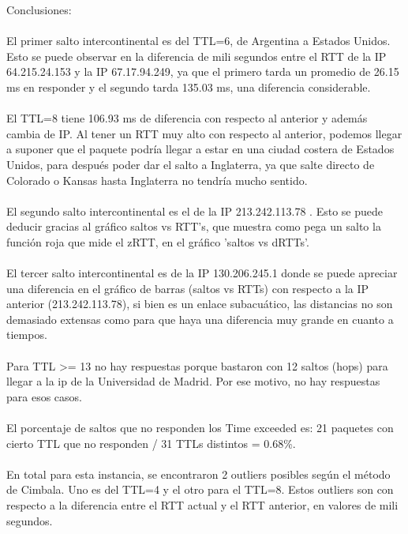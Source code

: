 Conclusiones: \\ \\

El primer salto intercontinental es del TTL=6, de Argentina a Estados Unidos. Esto se puede observar en la diferencia de mili segundos entre 
el RTT de la IP 64.215.24.153 y la IP 67.17.94.249, ya que el primero tarda un promedio de 26.15 ms en responder y el segundo tarda 135.03 ms,
una diferencia considerable. \\ \\

El TTL=8 tiene 106.93 ms de diferencia con respecto al anterior y además cambia de IP. Al tener un RTT muy alto con respecto al anterior,
podemos llegar a suponer que el paquete podría llegar a estar en una ciudad costera de Estados Unidos, para después poder dar el salto a Inglaterra,
ya que salte directo de Colorado o Kansas hasta Inglaterra no tendría mucho sentido. \\ \\

El segundo salto intercontinental es el de la IP 213.242.113.78 . Esto se puede deducir gracias al gráfico saltos vs RTT's, que muestra como pega un
salto la función roja que mide el zRTT, en el gráfico 'saltos vs dRTTs'.\\ \\

El tercer salto intercontinental es de la IP 130.206.245.1 donde se puede apreciar una diferencia en el gráfico de barras 
(saltos vs RTTs) con respecto a la IP anterior (213.242.113.78), si bien es un enlace subacuático,
las distancias no son demasiado extensas como para que haya una diferencia muy grande en cuanto a tiempos. \\ \\

Para TTL >= 13 no hay respuestas porque bastaron con 12 saltos (hops) para llegar a la ip de la Universidad de Madrid. Por ese motivo, 
no hay respuestas para esos casos. \\ \\ 


El porcentaje de saltos que no responden los Time exceeded es: 21 paquetes con cierto TTL que no responden / 31 TTLs distintos = 0.68\%.  \\ \\


En total para esta instancia, se encontraron 2 outliers posibles según el método de Cimbala. Uno es del TTL=4 y el otro para el TTL=8. 
Estos outliers son con respecto a la diferencia entre el RTT actual y el RTT anterior, en valores de mili segundos.\\ \\


